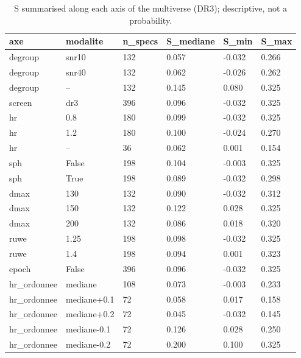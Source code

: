 \begin{table}
\caption{S summarised along each axis of the multiverse (DR3); descriptive, not a probability.}
\begin{tabular}{llllll}
\toprule
axe & modalite & n\_specs & S\_mediane & S\_min & S\_max \\
\midrule
degroup & snr10 & 132 & 0.057 & -0.032 & 0.266 \\
degroup & snr40 & 132 & 0.062 & -0.026 & 0.262 \\
degroup & -- & 132 & 0.145 & 0.080 & 0.325 \\
screen & dr3 & 396 & 0.096 & -0.032 & 0.325 \\
hr & 0.8 & 180 & 0.099 & -0.032 & 0.325 \\
hr & 1.2 & 180 & 0.100 & -0.024 & 0.270 \\
hr & -- & 36 & 0.062 & 0.001 & 0.154 \\
sph & False & 198 & 0.104 & -0.003 & 0.325 \\
sph & True & 198 & 0.089 & -0.032 & 0.298 \\
dmax & 130 & 132 & 0.090 & -0.032 & 0.312 \\
dmax & 150 & 132 & 0.122 & 0.028 & 0.325 \\
dmax & 200 & 132 & 0.086 & 0.018 & 0.320 \\
ruwe & 1.25 & 198 & 0.098 & -0.032 & 0.325 \\
ruwe & 1.4 & 198 & 0.094 & 0.001 & 0.323 \\
epoch & False & 396 & 0.096 & -0.032 & 0.325 \\
hr\_ordonnee & mediane & 108 & 0.073 & -0.003 & 0.233 \\
hr\_ordonnee & mediane+0.1 & 72 & 0.058 & 0.017 & 0.158 \\
hr\_ordonnee & mediane+0.2 & 72 & 0.045 & -0.032 & 0.145 \\
hr\_ordonnee & mediane-0.1 & 72 & 0.126 & 0.028 & 0.250 \\
hr\_ordonnee & mediane-0.2 & 72 & 0.200 & 0.100 & 0.325 \\
\bottomrule
\end{tabular}
\end{table}
